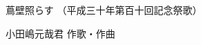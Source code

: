 \documentclass[10pt,b5j]{tarticle} %
\begin{document}
\begin{minipage}[c]{0.7\hsize} %
    \begin{center}
        {\LARGE
            蔦壁照らす %
        }
        {\small 
            （平成三十年第百十回記念祭歌） %
        }
    \end{center}
\end{minipage}
\begin{minipage}[c]{0.3\hsize} %
    \begin{flushright} %
        小田嶋元哉君 作歌・作曲 %
    \end{flushright}
\end{minipage}
\end{document}

